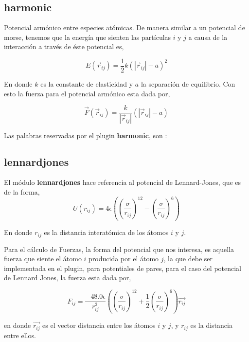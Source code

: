 \subsection{harmonic}
Potencial arm\'onico entre especies at\'omicas. De manera similar a un potencial
de morse, tenemos que la energ\'ia que sienten las part\'iculas $i$ y $j$ a
causa de la interacci\'on a trav\'es de \'este potencial es,

$$E(\vec{r}_{ij}) = \frac{1}{2}k\left(|\vec{r}_{ij}|-a\right)^2$$

En donde $k$ es la constante de elasticidad y $a$ la separaci\'on de equilibrio.
Con esto la fuerza para el potencial arm\'onico esta dada por,

$$\vec{F}(\vec{r}_{ij}) = \frac{k}{|\vec{r}_{ij}|}\left(|\vec{r}_{ij}|-a\right)$$

Las palabras reservadas por el plugin \textbf{harmonic}, son :


\subsection{lennardjones}
El m\'odulo \textbf{lennardjones} hace referencia al potencial de Lennard-Jones,
que es de la forma,
$$U(r_{ij}) =
4\epsilon\left(\left(\frac{\sigma}{r_{ij}}\right)^{12}-\left(\frac{\sigma}{r_{ij
}}\right)^6\right)$$

En donde $r_{ij}$ es la distancia interat\'omica de los \'atomos $i$ y $j$. 

Para el c\'alculo de Fuerzas, la forma del potencial que nos interesa, es
aquella fuerza que siente el \'atomo $i$ producida por el \'atomo $j$, la que
debe ser implementada en el plugin, para potentiales de pares, para el caso del
potencial de Lennard Jones, la fuerza esta dada por,

$$F_{ij} = \frac{-48.0\epsilon}{r_{ij}^2}\left(
\left(\frac{\sigma}{r_{ij}}\right)^{12} +
\frac{1}{2}\left(\frac{\sigma}{r_{ij}}\right)^6 \right) \vec{r_{ij}}$$

en donde $\vec{r_{ij}}$ es el vector distancia entre los \'atomos $i$ y $j$, y
$r_{ij}$ es la distancia entre ellos. 

